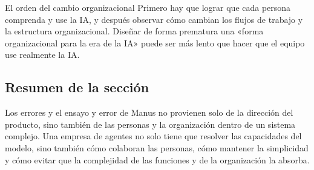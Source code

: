 \begin{importantbox}{El orden del cambio organizacional}
Primero hay que lograr que cada persona comprenda y use la IA, y después observar cómo cambian los flujos de trabajo y la estructura organizacional. Diseñar de forma prematura una «forma organizacional para la era de la IA» puede ser más lento que hacer que el equipo use realmente la IA.
\end{importantbox}

\subsection{Resumen de la sección}

Los errores y el ensayo y error de Manus no provienen solo de la dirección del producto, sino también de las personas y la organización dentro de un sistema complejo. Una empresa de agentes no solo tiene que resolver las capacidades del modelo, sino también cómo colaboran las personas, cómo mantener la simplicidad y cómo evitar que la complejidad de las funciones y de la organización la absorba.
